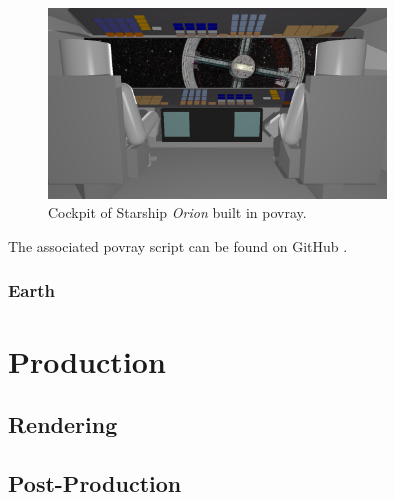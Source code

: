 \begin{figure}[ht]
	\centering
	\includegraphics[width=0.8\textwidth]{images/scene19587.png}
	\caption{Cockpit of Starship \textit{Orion} built in povray.}
	\label{cockpit_povray}
\end{figure}

The associated povray script can be found on GitHub \cite{Quving}.

\newpage
\subsection{Earth}

\chapter{Production}
\section{Rendering}
\section{Post-Production}